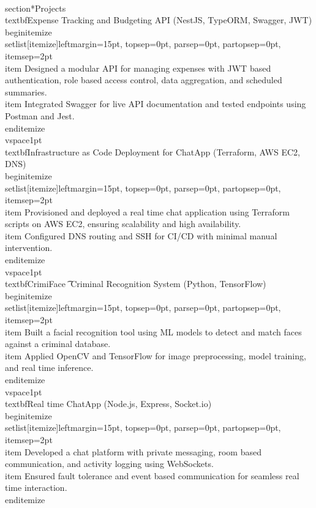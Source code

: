 \documentclass[10pt]{article}
\begin{document}
\\section*{\Large Projects}
\\textbf{Expense Tracking and Budgeting API} (NestJS, TypeORM, Swagger, JWT) \\begin{itemize}\\setlist[itemize]{leftmargin=15pt, topsep=0pt, parsep=0pt, partopsep=0pt, itemsep=2pt}
    \\item Designed a modular API for managing expenses with JWT\textendash{} based authentication, role\textendash{} based access control, data aggregation, and scheduled summaries. \\item Integrated Swagger for live API documentation and tested endpoints using Postman and Jest. \\end{itemize}
\\vspace{1pt}
\\textbf{Infrastructure\textendash{} as\textendash{} Code Deployment for ChatApp} (Terraform, AWS EC2, DNS) \\begin{itemize}\\setlist[itemize]{leftmargin=15pt, topsep=0pt, parsep=0pt, partopsep=0pt, itemsep=2pt}
    \\item Provisioned and deployed a real\textendash{} time chat application using Terraform scripts on AWS EC2, ensuring scalability and high availability. \\item Configured DNS routing and SSH for CI/CD with minimal manual intervention. \\end{itemize}
\\vspace{1pt}
\\textbf{CrimiFace \t\textendash{} Criminal Recognition System} (Python, TensorFlow) \\begin{itemize}\\setlist[itemize]{leftmargin=15pt, topsep=0pt, parsep=0pt, partopsep=0pt, itemsep=2pt}
    \\item Built a facial recognition tool using ML models to detect and match faces against a criminal database. \\item Applied OpenCV and TensorFlow for image preprocessing, model training, and real\textendash{} time inference. \\end{itemize}
\\vspace{1pt}
\\textbf{Real\textendash{} time ChatApp} (Node.js, Express, Socket.io) \\begin{itemize}\\setlist[itemize]{leftmargin=15pt, topsep=0pt, parsep=0pt, partopsep=0pt, itemsep=2pt}
    \\item Developed a chat platform with private messaging, room\textendash{} based communication, and activity logging using WebSockets. \\item Ensured fault\textendash{} tolerance and event\textendash{} based communication for seamless real\textendash{} time interaction. \\end{itemize}

\
\end{document}
